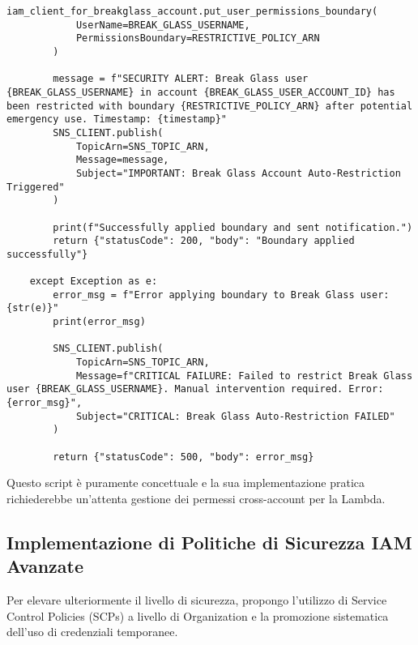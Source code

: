 \begin{enumerate}
\begin{lstlisting}[style=python, caption={Esempio concettuale Lambda per limitare utente Break Glass}, label=lst:breakglass-lambda-iam]
        iam_client_for_breakglass_account.put_user_permissions_boundary(
            UserName=BREAK_GLASS_USERNAME,
            PermissionsBoundary=RESTRICTIVE_POLICY_ARN 
        )
        
        message = f"SECURITY ALERT: Break Glass user {BREAK_GLASS_USERNAME} in account {BREAK_GLASS_USER_ACCOUNT_ID} has been restricted with boundary {RESTRICTIVE_POLICY_ARN} after potential emergency use. Timestamp: {timestamp}"
        SNS_CLIENT.publish(
            TopicArn=SNS_TOPIC_ARN,
            Message=message,
            Subject="IMPORTANT: Break Glass Account Auto-Restriction Triggered"
        )
        
        print(f"Successfully applied boundary and sent notification.")
        return {"statusCode": 200, "body": "Boundary applied successfully"}
        
    except Exception as e:
        error_msg = f"Error applying boundary to Break Glass user: {str(e)}"
        print(error_msg)
        
        SNS_CLIENT.publish(
            TopicArn=SNS_TOPIC_ARN,
            Message=f"CRITICAL FAILURE: Failed to restrict Break Glass user {BREAK_GLASS_USERNAME}. Manual intervention required. Error: {error_msg}",
            Subject="CRITICAL: Break Glass Auto-Restriction FAILED"
        )
        
        return {"statusCode": 500, "body": error_msg}
    \end{lstlisting}
    Questo script è puramente concettuale e la sua implementazione pratica richiederebbe un'attenta gestione dei permessi cross-account per la Lambda.
\end{enumerate}

\subsection{Implementazione di Politiche di Sicurezza IAM Avanzate}
Per elevare ulteriormente il livello di sicurezza, propongo l'utilizzo di Service Control Policies (SCPs) a livello di Organization e la promozione sistematica dell'uso di credenziali temporanee.

